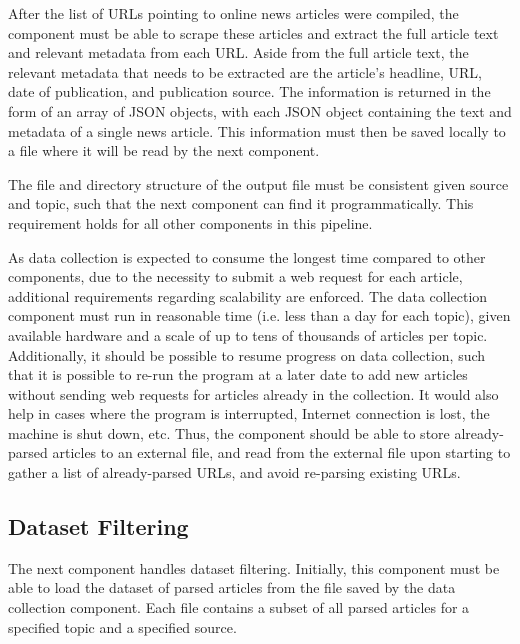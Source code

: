 \documentclass{report}
\begin{document}
After the list of URLs pointing to online news articles were compiled, the component must be able to scrape these articles and extract the full article text and relevant metadata from each URL.
Aside from the full article text, the relevant metadata that needs to be extracted are the article's headline, URL, date of publication, and publication source.
The information is returned in the form of an array of JSON objects, with each JSON object containing the text and metadata of a single news article.
This information must then be saved locally to a file where it will be read by the next component. 

The file and directory structure of the output file must be consistent given source and topic, such that the next component can find it programmatically.
This requirement holds for all other components in this pipeline.

As data collection is expected to consume the longest time compared to other components, due to the necessity to submit a web request for each article, additional requirements regarding scalability are enforced.
The data collection component must run in reasonable time (i.e. less than a day for each topic), given available hardware and a scale of up to tens of thousands of articles per topic.
Additionally, it should be possible to resume progress on data collection, such that it is possible to re-run the program at a later date to add new articles without sending web requests for articles already in the collection.
It would also help in cases where the program is interrupted, Internet connection is lost, the machine is shut down, etc.
Thus, the component should be able to store already-parsed articles to an external file, and read from the external file upon starting to gather a list of already-parsed URLs, and avoid re-parsing existing URLs.

\subsection{Dataset Filtering} \label{req-filtering}

The next component handles dataset filtering.
Initially, this component must be able to load the dataset of parsed articles from the file saved by the data collection component.
Each file contains a subset of all parsed articles for a specified topic and a specified source.
\end{document}
